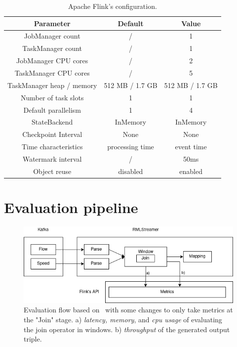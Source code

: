 \begin{table}[htbp]
    \centering
    \begin{tabular}{|c|c|c|}
        \hline
        \textbf{Parameter}        & \textbf{Default} & \textbf{Value}  \\ \hline
        JobManager count          & /                & 1               \\ \hline
        TaskManager count         & /                & 1               \\ \hline
        JobManager CPU cores      & /                & 2               \\ \hline
        TaskManager CPU cores     & /                & 5               \\ \hline
        TaskManager heap / memory & 512 MB / 1.7 GB  & 512 MB / 1.7 GB \\ \hline
        Number of task slots      & 1                & 1               \\ \hline
        Default parallelism       & 1                & 4               \\ \hline
        StateBackend              & InMemory         & InMemory        \\ \hline
        Checkpoint Interval       & None             & None            \\ \hline
        Time characteristics      & processing time  & event time      \\ \hline
        Watermark interval        & /                & 50ms            \\ \hline
        Object reuse              & disabled         & enabled         \\ \hline
    \end{tabular}
\caption{Apache Flink's configuration.
} 
\label{tab:computer_specs}
\end{table}

\section{Evaluation pipeline}
\begin{figure}[!htbp]
    \centering
    \includegraphics[width=\textwidth]{fig/evaluation_architecture.png}
    \caption{Evaluation flow based on~\cite{evalution_of_spe} with some changes to only 
    take metrics at the "Join" stage.
    a) \emph{latency, memory}, and \emph{cpu usage} of evaluating the join operator in windows.
    b) \emph{throughput} of the generated output triple.}
    \label{fig:evaluation_flow}
    
\end{figure}

